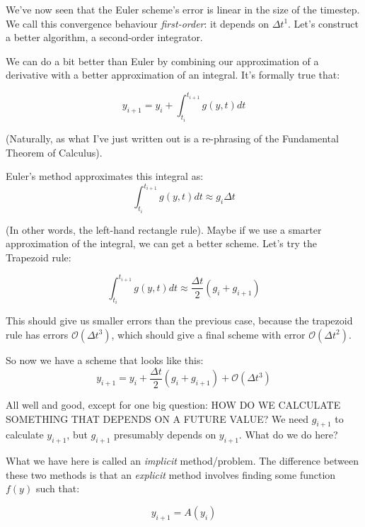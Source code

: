 \documentclass{article}
\theoremstyle{demo}
\begin{document}
We've now seen that the Euler scheme's error is linear in the size of the
timestep.  We call this convergence behaviour \textit{first-order}: it depends
on $\Delta t^1$.  Let's construct a better algorithm, a second-order integrator.

We can do a bit better than Euler by combining our approximation of a derivative
with a better approximation of an integral.  It's formally true that:

\begin{equation}
    y_{i+1} = y_i + \int_{t_i}^{t_{i+1}} g(y,t) dt
\end{equation}

(Naturally, as what I've just written out is a re-phrasing of the Fundamental
Theorem of Calculus).

Euler's method approximates this integral as:
\begin{equation}
    \int_{t_i}^{t_{i+1}} g(y,t) dt \approx g_i\Delta t
\end{equation}

(In other words, the left-hand rectangle rule).  Maybe if we use a smarter
approximation of the integral, we can get a better scheme.  Let's try the
Trapezoid rule:

\begin{equation}
    \int_{t_i}^{t_{i+1}} g(y,t) dt \approx \frac{\Delta t}{2}(g_i + g_{i+1})
\end{equation}

This should give us smaller errors than the previous case, because the trapezoid
rule has errors $\mathcal{O}(\Delta t^3)$, which should give a final scheme with
error $\mathcal{O}(\Delta t^2)$.

So now we have a scheme that looks like this:
\begin{equation}
    y_{i+1} = y_i + \frac{\Delta t}{2}(g_i+g_{i+1}) + \mathcal{O}(\Delta t^3)
\end{equation}

All well and good, except for one big question:  HOW DO WE CALCULATE SOMETHING
THAT DEPENDS ON A FUTURE VALUE?  We need $g_{i+1}$ to calculate $y_{i+1}$, but
$g_{i+1}$ presumably depends on $y_{i+1}$.  What do we do here?

What we have here is called an \textit{implicit} method/problem.  The difference
between these two methods is that an \textit{explicit} method involves finding
some function $f(y)$ such that:

\begin{equation}
    y_{i+1} = A(y_i)
\end{equation}
\end{document}
